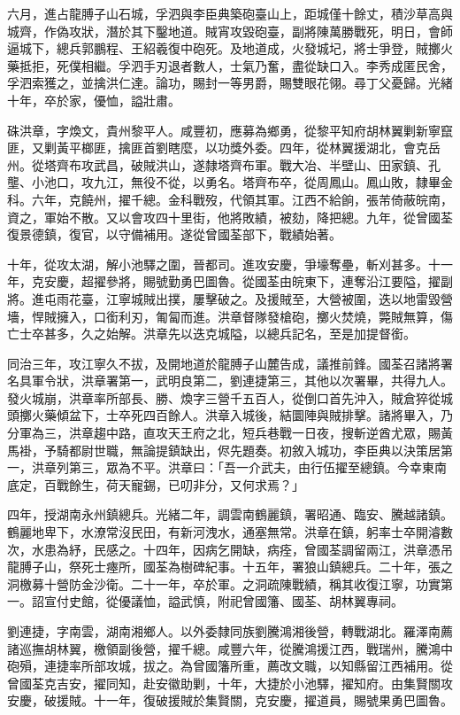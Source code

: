 \begin{pinyinscope}
六月，進占龍膊子山石城，孚泗與李臣典築砲臺山上，距城僅十餘丈，積沙草高與城齊，作偽攻狀，潛於其下鑿地道。賊宵攻毀砲臺，副將陳萬勝戰死，明日，會師逼城下，總兵郭鵬程、王紹羲復中砲死。及地道成，火發城圮，將士爭登，賊擲火藥抵拒，死僕相繼。孚泗手刃退者數人，士氣乃奮，盡從缺口入。李秀成匿民舍，孚泗索獲之，並擒洪仁達。論功，賜封一等男爵，賜雙眼花翎。尋丁父憂歸。光緒十年，卒於家，優恤，謚壯肅。

硃洪章，字煥文，貴州黎平人。咸豐初，應募為鄉勇，從黎平知府胡林翼剿新寧竄匪，又剿黃平榔匪，擒匪首劉瞎麼，以功獎外委。四年，從林翼援湖北，會克岳州。從塔齊布攻武昌，破賊洪山，遂隸塔齊布軍。戰大冶、半壁山、田家鎮、孔壟、小池口，攻九江，無役不從，以勇名。塔齊布卒，從周鳳山。鳳山敗，隸畢金科。六年，克饒州，擢千總。金科戰歿，代領其軍。江西不給餉，張芾倚蔽皖南，資之，軍始不散。又以會攻四十里街，他將敗績，被劾，降把總。九年，從曾國荃復景德鎮，復官，以守備補用。遂從曾國荃部下，戰績始著。

十年，從攻太湖，解小池驛之圍，晉都司。進攻安慶，爭壕奪壘，斬刈甚多。十一年，克安慶，超擢參將，賜號勤勇巴圖魯。從國荃由皖東下，連奪沿江要隘，擢副將。進屯雨花臺，江寧城賊出撲，屢擊破之。及援賊至，大營被圍，迭以地雷毀營墻，悍賊擁入，口銜利刃，匍匐而進。洪章督隊發槍砲，擲火焚燒，斃賊無算，傷亡士卒甚多，久之始解。洪章先以迭克城隘，以總兵記名，至是加提督銜。

同治三年，攻江寧久不拔，及開地道於龍膊子山麓告成，議推前鋒。國荃召諸將署名具軍令狀，洪章署第一，武明良第二，劉連捷第三，其他以次署畢，共得九人。發火城崩，洪章率所部長、勝、煥字三營千五百人，從倒口首先沖入，賊倉猝從城頭擲火藥傾盆下，士卒死四百餘人。洪章入城後，結圜陣與賊排擊。諸將畢入，乃分軍為三，洪章趨中路，直攻天王府之北，短兵巷戰一日夜，搜斬逆酋尤眾，賜黃馬褂，予騎都尉世職，無論提鎮缺出，侭先題奏。初敘入城功，李臣典以決策居第一，洪章列第三，眾為不平。洪章曰：「吾一介武夫，由行伍擢至總鎮。今幸東南底定，百戰餘生，荷天寵錫，已叨非分，又何求焉？」

四年，授湖南永州鎮總兵。光緒二年，調雲南鶴麗鎮，署昭通、臨安、騰越諸鎮。鶴麗地卑下，水潦常沒民田，有新河洩水，通塞無常。洪章在鎮，躬率士卒開濬數次，水患為紓，民感之。十四年，因病乞開缺，病痊，曾國荃調留兩江，洪章憑吊龍膊子山，祭死士瘞所，國荃為樹碑紀事。十五年，署狼山鎮總兵。二十年，張之洞檄募十營防金沙衛。二十一年，卒於軍。之洞疏陳戰績，稱其收復江寧，功實第一。詔宣付史館，從優議恤，謚武慎，附祀曾國籓、國荃、胡林翼專祠。

劉連捷，字南雲，湖南湘鄉人。以外委隸同族劉騰鴻湘後營，轉戰湖北。羅澤南薦諸巡撫胡林翼，檄領副後營，擢千總。咸豐六年，從騰鴻援江西，戰瑞州，騰鴻中砲殞，連捷率所部攻城，拔之。為曾國籓所重，薦改文職，以知縣留江西補用。從曾國荃克吉安，擢同知，赴安徽助剿，十年，大捷於小池驛，擢知府。由集賢關攻安慶，破援賊。十一年，復破援賊於集賢關，克安慶，擢道員，賜號果勇巴圖魯。


\end{pinyinscope}
